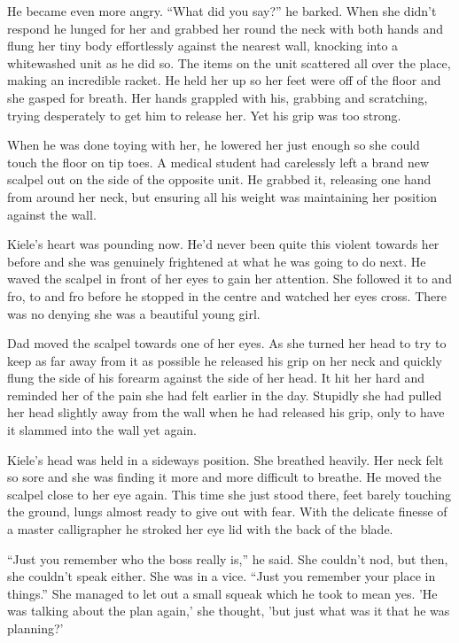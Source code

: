 He became even more angry. ``What did you say?'' he barked.    When she didn't respond he lunged for her and grabbed her round the neck with both hands and flung her tiny body effortlessly against the nearest wall, knocking into a whitewashed unit as he did so.  The items on the unit scattered all over the place, making an incredible racket.  He held her up so her feet were off of the floor and she gasped for breath.  Her hands grappled with his, grabbing and scratching, trying desperately to get him to release her.  Yet his grip was too strong.

When he was done toying with her, he lowered her just enough so she could touch the floor on tip toes.  A medical student had carelessly left a brand new scalpel out on the side of the opposite unit.  He grabbed it, releasing one hand from around her neck, but ensuring all his weight was maintaining her position against the wall.  

Kiele's heart was pounding now.  He'd never been quite this violent towards her before and she was genuinely frightened at what he was going to do next.  He waved the scalpel in front of her eyes to gain her attention.  She followed it to and fro, to and fro before he stopped in the centre and watched her eyes cross.  There was no denying she was a beautiful young girl.

Dad moved the scalpel towards one of her eyes.  As she turned her head to try to keep as far away from it as possible he released his grip on her neck and quickly flung the side of his forearm against the side of her head.  It hit her hard and reminded her of the pain she had felt earlier in the day.  Stupidly she had pulled her head slightly away from the wall when he had released his grip, only to have it slammed into the wall yet again.  

Kiele's head was held in a sideways position.  She breathed heavily.  Her neck felt so sore and she was finding it more and more difficult to breathe.  He moved the scalpel close to her eye again.  This time she just stood there, feet barely touching the ground, lungs almost ready to give out with fear.  With the delicate finesse of a master calligrapher he stroked her eye lid with the back of the blade.  

``Just you remember who the boss really is,'' he said.  She couldn't nod, but then, she couldn't speak either.  She was in a vice.  ``Just you remember your place in things.''  She managed to let out a small squeak which he took to mean yes.  'He was talking about the plan again,' she thought, 'but just what was it that he was planning?'  

